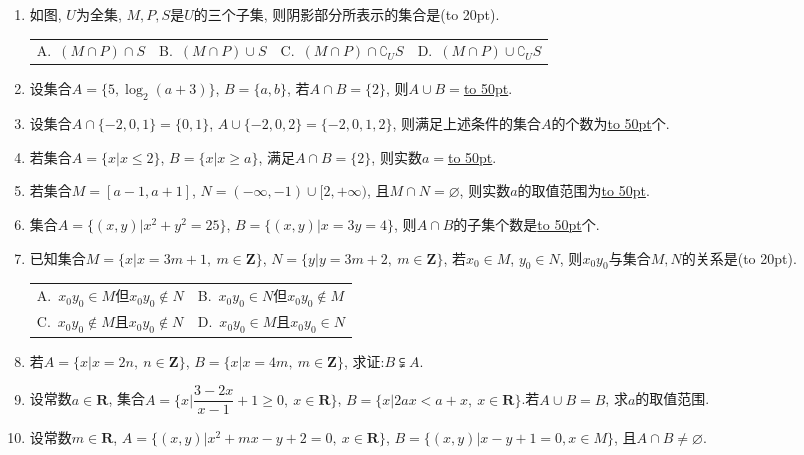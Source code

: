\documentclass[10pt,a4paper]{article}
\newcommand{\blank}[1]{\underline{\hbox to #1pt{}}}
\newcommand{\bracket}[1]{(\hbox to #1pt{})}
\newcommand{\twoch}[4]{\par\begin{tabular}{p{.46\textwidth}p{.46\textwidth}}
A.~#1& B.~#2\\
C.~#3& D.~#4
\end{tabular}}
\newcommand{\fourch}[4]{\par\begin{tabular}{p{.23\textwidth}p{.23\textwidth}p{.23\textwidth}p{.23\textwidth}}
A.~#1 &B.~#2& C.~#3& D.~#4
\end{tabular}}
\begin{document}
\begin{enumerate}[1.]
\item 如图, $U$为全集, $M,P,S$是$U$的三个子集, 则阴影部分所表示的集合是\bracket{20}.
\fourch{$(M\cap P)\cap S$}{$(M\cap P)\cup S$}{$(M\cap P)\cap \complement_U S$}{$(M\cap P)\cup \complement_U S$}
\begin{center}
\end{center}
\item 设集合$A=\{5,\log_2(a+3)\}$, $B=\{a,b\}$, 若$A\cap B=\{2\}$, 则$A\cup B=$\blank{50}.
\item 设集合$A\cap \{-2,0,1\}=\{0,1\}$, $A\cup \{-2,0,2\}=\{-2,0,1,2\}$, 则满足上述条件的集合$A$的个数为\blank{50}个.
\item 若集合$A=\{x|x\le 2\}$, $B=\{x|x\ge a\}$, 满足$A\cap B=\{2\}$, 则实数$a=$\blank{50}.
\item 若集合$M=[a-1,a+1]$, $N=(-\infty,-1)\cup [2,+\infty)$, 且$M\cap N=\varnothing$, 则实数$a$的取值范围为\blank{50}.
\item 集合$A=\{(x,y)|x^2+y^2=25\}$, $B=\{(x,y)|x=3y=4\}$, 则$A\cap B$的子集个数是\blank{50}个.
\item 已知集合$M=\{x|x=3m+1, \ m\in \mathbf{Z}\}$, $N=\{y|y=3m+2, \ m\in \mathbf{Z}\}$, 若$x_0\in M$, $y_0\in N$, 则$x_0y_0$与集合$M,N$的关系是\bracket{20}.
\twoch{$x_0y_0\in M$但$x_0y_0$$\notin N$}{$x_0y_0\in N$但$x_0y_0\notin M$}{$x_0y_0\notin M$且$x_0y_0\notin N$}{$x_0y_0$$\in M$且$x_0y_0\in N$}
\item 若$A=\{x|x=2n,\ n\in \mathbf{Z}\}$, $B=\{x|x=4m,\ m\in \mathbf{Z}\}$, 求证:$B\subsetneqq A$.
\item 设常数$a\in \mathbf{R}$, 集合$A=\{x|\dfrac{3-2x}{x-1}+1 \ge 0, \ x\in \mathbf{R}\}$, $B=\{x|2ax<a+x, \ x\in \mathbf{R} \}$.若$A\cup B=B$, 求$a$的取值范围.
\item 设常数$m\in \mathbf{R}$, $A=\{(x,y)|x^2+mx-y+2=0,\ x\in \mathbf{R}\}$, $B=\{(x,y)|x-y+1=0, x\in M\}$, 且$A\cap B\ne\varnothing$.\\

\end{enumerate}
\end{document}
